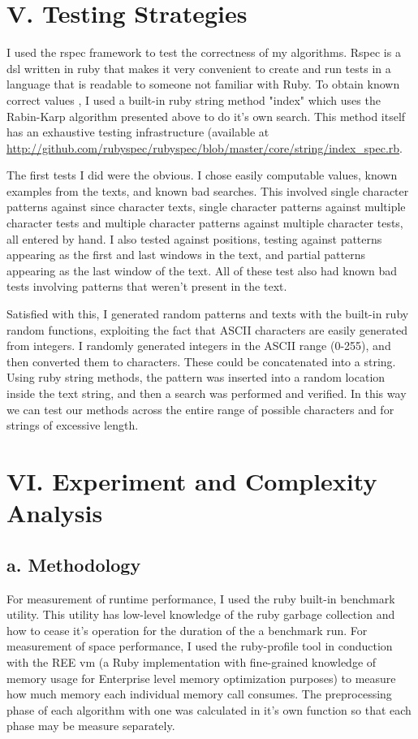 \documentclass{chi2005}
\begin{document}
\section{V. Testing Strategies}

I used the rspec framework to test the correctness of my algorithms. Rspec is a dsl written in ruby that makes it very convenient to create and run tests in a language that is readable to someone not familiar with Ruby. To obtain known  correct values , I used a built-in ruby string method "index" which uses the Rabin-Karp algorithm presented above to do it's own search. This method itself has an exhaustive testing infrastructure (available at \url{http://github.com/rubyspec/rubyspec/blob/master/core/string/index_spec.rb}.

The first tests I did were the obvious. I chose easily computable values, known examples from the texts, and known bad searches. This involved single character patterns against since character texts, single character patterns against multiple character tests and multiple character patterns against multiple character tests, all entered by hand. I also tested against positions, testing against patterns appearing as the first and last windows in the text, and partial patterns appearing as the last window of the text. All of these test also had known bad tests involving patterns that weren't present in the text.

Satisfied with this, I generated random patterns and texts with the built-in ruby random functions, exploiting the fact that ASCII characters are easily generated from integers. I randomly generated integers in the ASCII range (0-255), and then converted them to characters. These could be concatenated into a string. Using ruby string methods, the pattern was inserted into a random location inside the text string, and then a search was performed and verified. In this way we can test our methods across the entire range of possible characters and for strings of excessive length.

\section{VI. Experiment and Complexity Analysis}

\subsection{a. Methodology}

For measurement of runtime performance, I used the ruby built-in benchmark utility. This utility has low-level knowledge of the ruby garbage collection and how to cease it's operation for the duration of the a benchmark run. For measurement of space performance, I used the ruby-profile tool in conduction with the REE vm (a Ruby implementation with fine-grained knowledge of memory usage for Enterprise level memory optimization purposes) to measure how much memory each individual memory call consumes. The preprocessing phase of each algorithm with one was calculated in it's own function so that each phase may be measure separately. 
\end{document}
